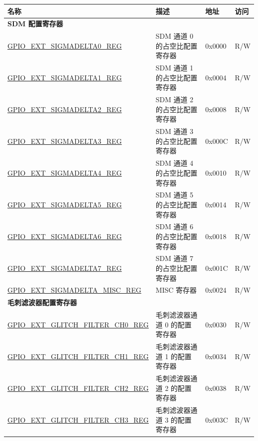 \begin{longtable}{ | p{6.2cm} | p{7cm} | p{1.3cm} | p{1cm} | }
\hline\rowcolor{lightgray}
\textbf{名称} & \textbf{描述} &  \textbf{地址} & \textbf{访问} \\ \hline
\endhead
\multicolumn{4}{|l|}{\textbf{SDM 配置寄存器}} \\ \hline
\hyperref[regdesc:GPIOSDSIGMADELTANREG]{GPIO\_EXT\_SIGMADELTA0\_REG} & SDM 通道 0 的占空比配置寄存器 & 0x0000 & R/W \\ \hline
\hyperref[regdesc:GPIOSDSIGMADELTANREG]{GPIO\_EXT\_SIGMADELTA1\_REG} & SDM 通道 1 的占空比配置寄存器 & 0x0004 & R/W \\ \hline
\hyperref[regdesc:GPIOSDSIGMADELTANREG]{GPIO\_EXT\_SIGMADELTA2\_REG} & SDM 通道 2 的占空比配置寄存器 & 0x0008 & R/W \\ \hline
\hyperref[regdesc:GPIOSDSIGMADELTANREG]{GPIO\_EXT\_SIGMADELTA3\_REG} & SDM 通道 3 的占空比配置寄存器 & 0x000C & R/W \\ \hline
\hyperref[regdesc:GPIOSDSIGMADELTANREG]{GPIO\_EXT\_SIGMADELTA4\_REG} & SDM 通道 4 的占空比配置寄存器 & 0x0010 & R/W \\ \hline
\hyperref[regdesc:GPIOSDSIGMADELTANREG]{GPIO\_EXT\_SIGMADELTA5\_REG} & SDM 通道 5 的占空比配置寄存器 & 0x0014 & R/W \\ \hline
\hyperref[regdesc:GPIOSDSIGMADELTANREG]{GPIO\_EXT\_SIGMADELTA6\_REG} & SDM 通道 6 的占空比配置寄存器 & 0x0018 & R/W \\ \hline
\hyperref[regdesc:GPIOSDSIGMADELTANREG]{GPIO\_EXT\_SIGMADELTA7\_REG} & SDM 通道 7 的占空比配置寄存器 & 0x001C & R/W \\ \hline
\hyperref[regdesc:GPIOSDSIGMADELTAMISCREG]{GPIO\_EXT\_SIGMADELTA\_MISC\_REG} & MISC 寄存器 & 0x0024 & R/W \\ \hline
\multicolumn{4}{|l|}{\textbf{毛刺滤波器配置寄存器}} \\ \hline
\hyperref[regdesc:GPIOSDGLITCHFILTERCHNREG]{GPIO\_EXT\_GLITCH\_FILTER\_CH0\_REG} & 毛刺滤波器通道 0 的配置寄存器 & 0x0030 & R/W \\ \hline
\hyperref[regdesc:GPIOSDGLITCHFILTERCHNREG]{GPIO\_EXT\_GLITCH\_FILTER\_CH1\_REG} & 毛刺滤波器通道 1 的配置寄存器 & 0x0034 & R/W \\ \hline
\hyperref[regdesc:GPIOSDGLITCHFILTERCHNREG]{GPIO\_EXT\_GLITCH\_FILTER\_CH2\_REG} & 毛刺滤波器通道 2 的配置寄存器 & 0x0038 & R/W \\ \hline
\hyperref[regdesc:GPIOSDGLITCHFILTERCHNREG]{GPIO\_EXT\_GLITCH\_FILTER\_CH3\_REG} & 毛刺滤波器通道 3 的配置寄存器 & 0x003C & R/W \\ \hline

\end{longtable}
